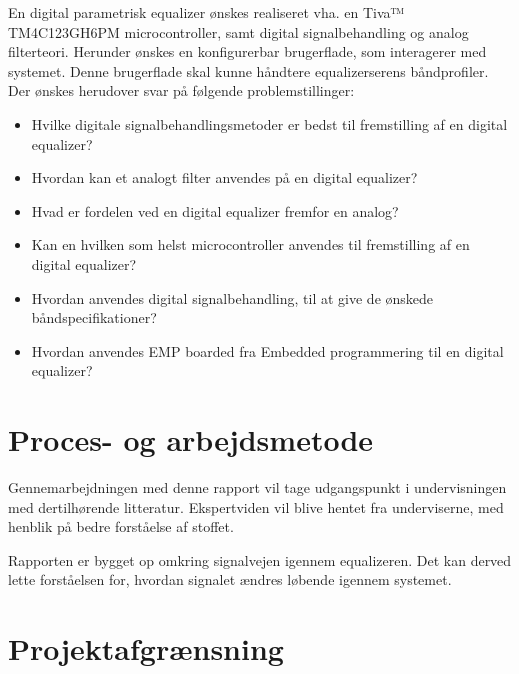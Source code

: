 En digital parametrisk equalizer ønskes realiseret vha. en Tiva™ TM4C123GH6PM microcontroller, samt digital signalbehandling og analog filterteori. Herunder ønskes en konfigurerbar brugerflade, som interagerer med systemet. Denne brugerflade skal kunne håndtere equalizerserens båndprofiler.\\

Der ønskes herudover svar på følgende problemstillinger:
\begin{itemize}
	\item Hvilke digitale signalbehandlingsmetoder er bedst til fremstilling af en digital equalizer?
	\item Hvordan kan et analogt filter anvendes på en digital equalizer?
	\item Hvad er fordelen ved en digital equalizer fremfor en analog?
	\item Kan en hvilken som helst microcontroller anvendes til fremstilling af en digital equalizer?
	\item Hvordan anvendes digital signalbehandling, til at give de ønskede båndspecifikationer?
	\item Hvordan anvendes EMP boarded fra Embedded programmering til en digital equalizer?
\end{itemize}


\section{Proces- og arbejdsmetode}

Gennemarbejdningen med denne rapport vil tage udgangspunkt i undervisningen med dertilhørende litteratur. Ekspertviden vil blive hentet fra underviserne, med henblik på bedre forståelse af stoffet.

Rapporten er bygget op omkring signalvejen igennem equalizeren. Det kan derved lette forståelsen for, hvordan signalet ændres løbende igennem systemet.


\section{Projektafgrænsning}

